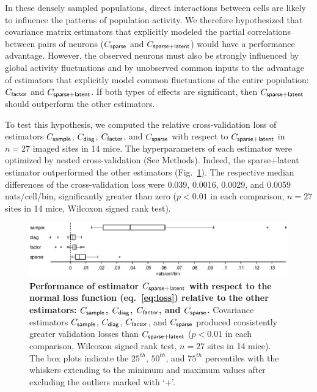 \documentclass[10pt]{article}
\begin{document}
In these densely sampled populations, direct interactions between cells are likely to influence the patterns of population activity.  We therefore hypothesized that covariance matrix estimators that explicitly modeled the partial correlations between pairs of neurons ($C_{\sf sparse}$ and $C_{\sf sparse+latent}$) would have a performance advantage.  However, the observed neurons must also be strongly influenced by global activity fluctuations and by unobserved common inputs to the advantage of estimators that explicitly model common fluctuations of the entire population: $C_{\sf factor}$ and $C_{\sf sparse+latent}$.  If both types of effects are significant, then $C_{\sf sparse+latent}$ should outperform the other estimators.

To test this hypothesis, we computed the relative cross-validation loss of estimators  $C_{\sf sample}$, $C_{\sf diag}$, $C_{\sf factor}$, and $C_{\sf sparse}$ with respect to $C_{\sf sparse+latent}$ in $n=27$ imaged sites in 14 mice.  The hyperparameters of each estimator were optimized by nested cross-validation (See Methods). Indeed, the sparse+latent estimator outperformed the other estimators (Fig.~\ref{fig:3}). The respective median differences of the cross-validation loss were 0.039, 0.0016, 0.0029, and 0.0059 nats/cell/bin, significantly greater than zero ($p<0.01$ in each comparison, $n=27$ sites in 14 mice, Wilcoxon signed rank test).  

\begin{figure}[!ht]
    \begin{center}
    \includegraphics{./figures/src/Fig3.eps}
    \end{center}
    \caption{
   {\bf Performance of estimator $C_{\sf sparse+latent}$ with respect to the normal loss function (eq.~\ref{eq:loss}) relative to the other estimators: $C_{\sf sample}$, $C_{\sf diag}$, $C_{\sf factor}$, and $C_{\sf sparse}$.} 
    Covariance estimators $C_{\sf sample}$, $C_{\sf diag}$, $C_{\sf factor}$, and $C_{\sf sparse}$ produced consistently greater validation losses than $C_{\sf sparse+latent}$ ($p<0.01$ in each comparison, Wilcoxon signed rank test, $n=27$ sites in 14 mice). The box plots indicate the $25^{th}$, $50^{th}$, and $75^{th}$ percentiles with the whiskers extending to the minimum and maximum values after excluding the outliers marked with `+'. 
} \label{fig:3}
\end{figure}
\end{document}
